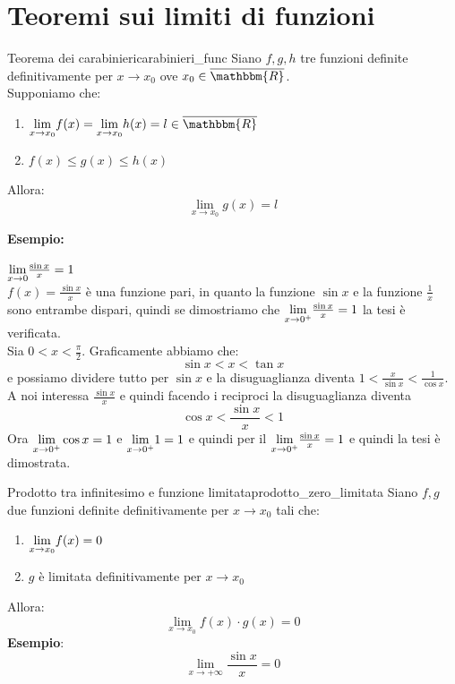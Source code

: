 \documentclass[12pt]{report}
\newcounter{theorem}
\newcommand{\namerefl}[1]{%
	\bgroup
	\let\nmu\MakeLowercase
	\nameref{#1}\egroup}
\newcommand{\nmu}{}
\begin{document}
	\section{Teoremi sui limiti di funzioni}
	\begin{theorem}{\nmu Teorema dei carabinieri}{carabinieri_func}
		Siano $f, g, h$ tre funzioni definite definitivamente per $x \to x_0$ ove $x_0 \in \overline{\mathbbm{R}}$. \\
		Supponiamo che:
		\begin{enumerate}
			\item $\mathlarger{\lim_{x \to x_0}} f(x) = \mathlarger{\lim_{x \to x_0}}h(x) = l \in \overline{\mathbbm{R}}$
			\item $f(x) \leq g(x) \leq h(x)$
		\end{enumerate}
		Allora:
		\[
		\lim_{x \to x_0}g(x) = l
		\]
	\end{theorem}
	\textbf{Esempio:}
	\begin{assignment}{}{}
		$\mathlarger{\lim_{x \to 0}}\frac{\sin x}{x} = 1$ \\
		$f(x) = \frac{\sin x}{x}$ è una funzione pari, in quanto la funzione $\sin x$ e la funzione $\frac{1}{x}$ sono entrambe dispari, quindi se dimostriamo che $\mathlarger{\lim_{x \to 0^+}}\frac{\sin x}{x} = 1$ la tesi è verificata. \\
		Sia $0 < x < \frac{\pi}{2}$.
		Graficamente abbiamo che:
		\[\sin x < x < \tan x\] e possiamo dividere tutto per $\sin x$ e la disuguaglianza diventa $1 < \frac{x}{\sin x} < \frac{1}{\cos x}$. \\
		A noi interessa $\frac{\sin x}{x}$ e quindi facendo i reciproci la disuguaglianza diventa \[\cos x < \frac{\sin x}{x} < 1\]
		Ora $\mathlarger{\lim_{x \to 0^+}}\cos x = 1$ e $\mathlarger{\lim_{x \to 0^+}} 1 = 1$ e quindi per il \namerefl{th:carabinieri_func} $\mathlarger{\lim_{x \to 0^+}} \frac{\sin x}{x} = 1$ e quindi la tesi è dimostrata.
	\end{assignment}
	\begin{theorem}{\nmu Prodotto tra infinitesimo e funzione limitata}{prodotto_zero_limitata}
		Siano $f, g$ due funzioni definite definitivamente per $x \to x_0$ tali che:
		\begin{enumerate}
			\item $\mathlarger{\lim_{x \to x_0}}f(x) =0$
			\item $g$ è limitata definitivamente per $x \to x_0$
		\end{enumerate}
		Allora:
		\[
		\lim_{x \to x_0}f(x) \cdot g(x) = 0
		\]
		\textbf{Esempio}:
		\[
		\lim_{x \to +\infty} \frac{\sin x}{x} = 0
		\]
	\end{theorem}
\end{document}
